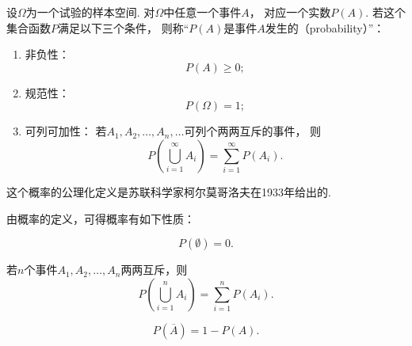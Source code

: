 \begin{definition}
设\(\Omega\)为一个试验的样本空间.
对\(\Omega\)中任意一个事件\(A\)，
对应一个实数\(P(A)\).
若这个集合函数\(P\)满足以下三个条件，
则称“\(P(A)\)是事件\(A\)发生的（probability）”：
\begin{enumerate}
	\item 非负性：
	\begin{equation}
	P(A) \geq 0;
	\end{equation}

	\item 规范性：
	\begin{equation}
	P(\Omega) = 1;
	\end{equation}

	\item 可列可加性：
	若\(A_1,A_2,\dotsc,A_n,\dotsc\)可列个两两互斥的事件，
	则\begin{equation}
		P\left(\bigcup_{i=1}^\infty A_i\right)
		= \sum\limits_{i=1}^\infty P(A_i).
	\end{equation}
\end{enumerate}
\end{definition}
这个概率的公理化定义是苏联科学家柯尔莫哥洛夫在1933年给出的.

由概率的定义，可得概率有如下性质：
\begin{property}
\begin{equation}
P(\emptyset) = 0.
\end{equation}
\end{property}

\begin{property}[有限可加性]
若\(n\)个事件\(A_1,A_2,\dotsc,A_n\)两两互斥，则\begin{equation}
P\left(\bigcup_{i=1}^{n}{A_i}\right)
= \sum\limits_{i=1}^n{P(A_i)}.
\end{equation}
\end{property}

\begin{property}
\begin{equation}
P(\overline{A}) = 1 - P(A).
\end{equation}
\end{property}

